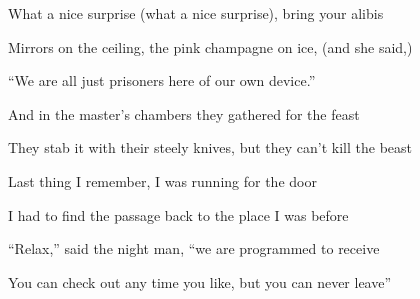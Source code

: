 What a nice surprise (what a nice surprise),
bring your alibis
\kr

\zs
Mirrors on the ceiling,
the pink champagne on ice, (and she said,)

``We are all just prisoners here of our own device.''

And in the master's chambers
they gathered for the feast

They stab it with their steely knives,
but they can't kill the beast
\ks

\zs
Last thing I remember,
I was running for the door

I had to find the passage
back to the place I was before

``Relax,'' said the night man,
``we are programmed to receive

You can check out any time you like,
but you can never leave''
\ks

\kp






















